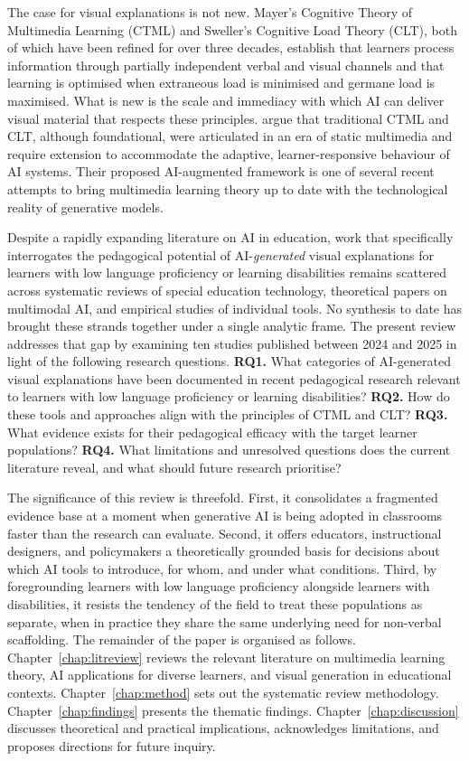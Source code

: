 The case for visual explanations is not new. Mayer's Cognitive Theory of Multimedia Learning (CTML) and Sweller's Cognitive Load Theory (CLT), both of which have been refined for over three decades, establish that learners process information through partially independent verbal and visual channels and that learning is optimised when extraneous load is minimised and germane load is maximised. What is new is the scale and immediacy with which AI can deliver visual material that respects these principles. \citet{twabu2025} argue that traditional CTML and CLT, although foundational, were articulated in an era of static multimedia and require extension to accommodate the adaptive, learner-responsive behaviour of AI systems. Their proposed AI-augmented framework is one of several recent attempts to bring multimedia learning theory up to date with the technological reality of generative models.

Despite a rapidly expanding literature on AI in education, work that specifically interrogates the pedagogical potential of AI-\emph{generated} visual explanations for learners with low language proficiency or learning disabilities remains scattered across systematic reviews of special education technology, theoretical papers on multimodal AI, and empirical studies of individual tools. No synthesis to date has brought these strands together under a single analytic frame. The present review addresses that gap by examining ten studies published between 2024 and 2025 in light of the following research questions. \textbf{RQ1.} What categories of AI-generated visual explanations have been documented in recent pedagogical research relevant to learners with low language proficiency or learning disabilities? \textbf{RQ2.} How do these tools and approaches align with the principles of CTML and CLT? \textbf{RQ3.} What evidence exists for their pedagogical efficacy with the target learner populations? \textbf{RQ4.} What limitations and unresolved questions does the current literature reveal, and what should future research prioritise?

The significance of this review is threefold. First, it consolidates a fragmented evidence base at a moment when generative AI is being adopted in classrooms faster than the research can evaluate. Second, it offers educators, instructional designers, and policymakers a theoretically grounded basis for decisions about which AI tools to introduce, for whom, and under what conditions. Third, by foregrounding learners with low language proficiency alongside learners with disabilities, it resists the tendency of the field to treat these populations as separate, when in practice they share the same underlying need for non-verbal scaffolding. The remainder of the paper is organised as follows. Chapter~\ref{chap:litreview} reviews the relevant literature on multimedia learning theory, AI applications for diverse learners, and visual generation in educational contexts. Chapter~\ref{chap:method} sets out the systematic review methodology. Chapter~\ref{chap:findings} presents the thematic findings. Chapter~\ref{chap:discussion} discusses theoretical and practical implications, acknowledges limitations, and proposes directions for future inquiry.
